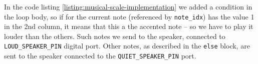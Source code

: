 \documentclass[../sparc.tex]{subfiles}
\begin{document}
In the code listing \ref{listing:musical-scale-implementation} we added a
condition in the loop body, so if for the current note (referenced by
\texttt{note\_idx}) has the value 1 in the 2nd column, it means that this a the
accented note -- so we have to play it louder than the others.  Such notes we
send to the speaker, connected to \texttt{LOUD\_SPEAKER\_PIN} digital port.
Other notes, as described in the \texttt{else} block, are sent to the speaker
connected to the \texttt{QUIET\_SPEAKER\_PIN} port.
\end{document}
